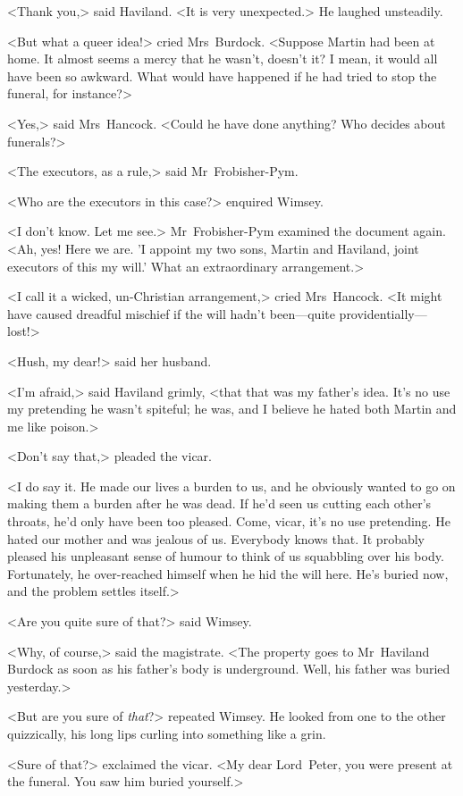 <Thank you,> said Haviland. <It is very unexpected.> He laughed unsteadily.

<But what a queer idea!> cried Mrs~Burdock. <Suppose Martin had been at home. It almost seems a mercy that he wasn't, doesn't it? I mean, it would all have been so awkward. What would have happened if he had tried to stop the funeral, for instance?>

<Yes,> said Mrs~Hancock. <Could he have done anything? Who decides about funerals?>

<The executors, as a rule,> said Mr~Frobisher-Pym.

<Who are the executors in this case?> enquired Wimsey.

<I don't know. Let me see.> Mr~Frobisher-Pym examined the document again. <Ah, yes! Here we are. 'I appoint my two sons, Martin and Haviland, joint executors of this my will.' What an extraordinary arrangement.>

<I call it a wicked, un-Christian arrangement,> cried Mrs~Hancock. <It might have caused dreadful mischief if the will hadn't been—quite providentially—lost!>

<Hush, my dear!> said her husband.

<I'm afraid,> said Haviland grimly, <that that was my father's idea. It's no use my pretending he wasn't spiteful; he was, and I believe he hated both Martin and me like poison.>

<Don't say that,> pleaded the vicar.

<I do say it. He made our lives a burden to us, and he obviously wanted to go on making them a burden after he was dead. If he'd seen us cutting each other's throats, he'd only have been too pleased. Come, vicar, it's no use pretending. He hated our mother and was jealous of us. Everybody knows that. It probably pleased his unpleasant sense of humour to think of us squabbling over his body. Fortunately, he over-reached himself when he hid the will here. He's buried now, and the problem settles itself.>

<Are you quite sure of that?> said Wimsey.

<Why, of course,> said the magistrate. <The property goes to Mr~Haviland Burdock as soon as his father's body is underground. Well, his father was buried yesterday.>

<But are you sure of \textit{that}?> repeated Wimsey. He looked from one to the other quizzically, his long lips curling into something like a grin.

<Sure of that?> exclaimed the vicar. <My dear Lord~Peter, you were present at the funeral. You saw him buried yourself.>

